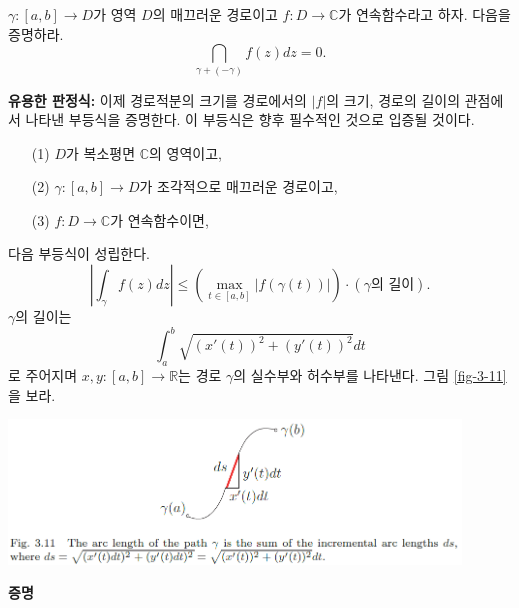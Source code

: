 \begin{salt_exercise} \label{ex-3-8}
$\gamma: [a,b] \to D$가 영역 $D$의 매끄러운 경로이고
$f:D\to\mathbb C$가 연속함수라고 하자. 다음을 증명하라.
\[
\dint_{\gamma+(-\gamma)} f(z)dz =0.
\]
\end{salt_exercise}

{\bf 유용한 판정식:}
이제 경로적분의 크기를 경로에서의 $|f|$의 크기, 경로의 길이의 관점에서
나타낸 부등식을 증명한다. 이 부등식은 향후 필수적인 것으로 입증될 것이다.

\begin{saltprop}{}{} \label{prop-3-4}
\begin{itemize}
\item[(1)] $D$가 복소평면 $\mathbb C$의 영역이고,
\item[(2)]  $\gamma : [a,b] \to D$가 조각적으로 매끄러운 경로이고,
\item[(3)] $f:D\to\mathbb C$가 연속함수이면,
\end{itemize}
다음 부등식이 성립한다.
\begin{equation} \label{eq-3-3}
\left| \int_\gamma f(z)dz \right| 
\le \left( \max_{t\in[a,b]} |f(\gamma(t))| \right) 
\cdot (\gamma \text{의 길이}).
\end{equation}
$\gamma$의 길이는 
\[
\int_a^b \sqrt{ (x'(t))^2 + (y'(t))^2} dt
\]
로 주어지며 $x,y: [a,b] \to \mathbb R$는
경로 $\gamma$의 실수부와 허수부를 나타낸다.
그림 \ref{fig-3-11}을 보라.
\begin{center}
\includegraphics[width=0.9\textwidth]{./SaltChapter/fig-3-11}
\end{center}
\label{fig-3-11}
\end{saltprop}

{\bf 증명}

